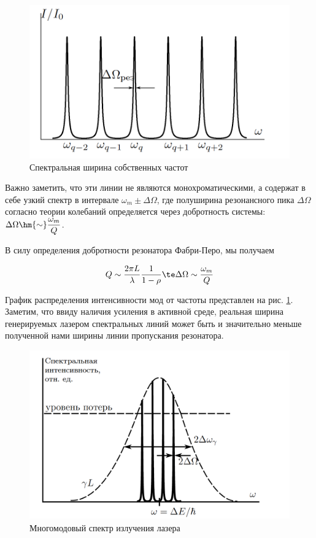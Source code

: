 \documentclass[12pt]{kiarticle}
\begin{document}
\begin{figure} 
	\includegraphics[width=\linewidth]{piks.png}
	\caption{Спектральная ширина собственных частот}
	\label{piks}
\end{figure}

Важно заметить, что эти линии не являются монохроматическими, а содержат в себе узкий спектр в интервале $ \omega_m \pm \Delta \Omega $, где полуширина резонансного пика $ \Delta \Omega $ согласно теории колебаний определяется через добротность системы: $ \Delta \Omega \hm{\sim} \dfrac{\omega_m}{Q} $. 

В силу определения добротности резонатора Фабри-Перо, мы получаем 

\begin{equation}\label{Q}
Q \sim \dfrac{2\pi L}{\lambda} \dfrac{1}{1 - \rho} \te \Delta \Omega \sim \dfrac{\omega_m}{Q}
\end{equation}

График распределения интенсивности мод от частоты представлен на рис. \ref{piks}. Заметим, что ввиду наличия усиления в активной среде, реальная ширина генерируемых лазером спектральных линий может быть
и значительно меньше полученной нами ширины линии пропускания резонатора. 

\begin{figure}[h!]
	\centering
	\includegraphics[width=0.7\linewidth]{mods.png}
	\caption{Многомодовый спектр излучения лазера}
	\label{mods}
\end{figure}
\end{document}
